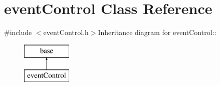 \hypertarget{classevent_control}{
\section{eventControl Class Reference}
\label{classevent_control}
}


{\ttfamily \#include $<$eventControl.h$>$}Inheritance diagram for eventControl::\begin{figure}[H]
\begin{center}
\leavevmode
\includegraphics[height=2cm]{classevent_control}
\end{center}
\end{figure}

